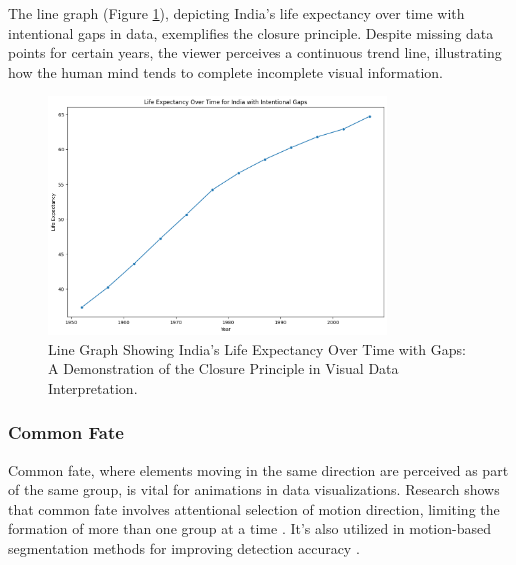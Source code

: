 The line graph (Figure \ref{fig:lo2_line_chart_w_gaps}), depicting India's life expectancy over time with intentional gaps in data, exemplifies the closure principle. Despite missing data points for certain years, the viewer perceives a continuous trend line, illustrating how the human mind tends to complete incomplete visual information.

\begin{figure}[h]
    \centering
\includegraphics[width=0.8\textwidth]{images/plots/lo2_life_exp_over_time_with_gaps_India.png}
    \caption{Line Graph Showing India's Life Expectancy Over Time with Gaps: A Demonstration of the Closure Principle in Visual Data Interpretation.}
    \label{fig:lo2_line_chart_w_gaps}
\end{figure}

\subsubsection{Common Fate}

Common fate, where elements moving in the same direction are perceived as part of the same group, is vital for animations in data visualizations. Research shows that common fate involves attentional selection of motion direction, limiting the formation of more than one group at a time \cite{levinthalCommonFateGroupingFeature2011}. It's also utilized in motion-based segmentation methods for improving detection accuracy \cite{kopacsiCommonFateBased2019}.